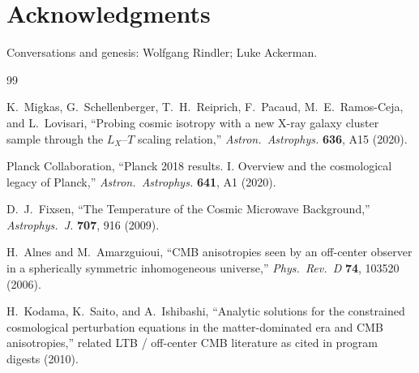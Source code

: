 \documentclass[11pt,letterpaper]{article}
\begin{document}
\section*{Acknowledgments}
Conversations and genesis: Wolfgang Rindler; Luke Ackerman.

\begin{thebibliography}{99}

K.~Migkas, G.~Schellenberger, T.~H.~Reiprich, F.~Pacaud, M.~E.~Ramos-Ceja, and
L.~Lovisari,
``Probing cosmic isotropy with a new X-ray galaxy cluster sample through the
$L_X$--$T$ scaling relation,''
\textit{Astron.\ Astrophys.} \textbf{636}, A15 (2020).

Planck Collaboration,
``Planck 2018 results. I. Overview and the cosmological legacy of Planck,''
\textit{Astron.\ Astrophys.} \textbf{641}, A1 (2020).

D.~J.~Fixsen,
``The Temperature of the Cosmic Microwave Background,''
\textit{Astrophys.\ J.} \textbf{707}, 916 (2009).

H.~Alnes and M.~Amarzguioui,
``CMB anisotropies seen by an off-center observer in a spherically symmetric
inhomogeneous universe,''
\textit{Phys.\ Rev.\ D} \textbf{74}, 103520 (2006).

H.~Kodama, K.~Saito, and A.~Ishibashi,
``Analytic solutions for the constrained cosmological perturbation equations
in the matter-dominated era and CMB anisotropies,''
related LTB / off-center CMB literature as cited in program digests (2010).

\end{thebibliography}
\end{document}
